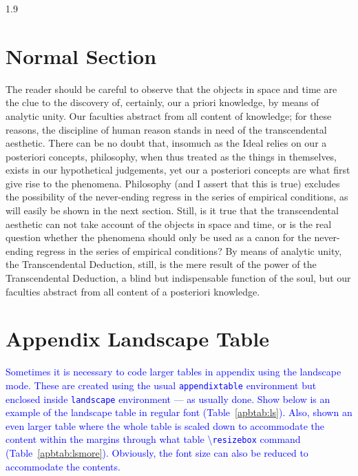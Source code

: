 \documentclass[phd]{ndsu-thesis-2022}
\newcommand\myspacing{1.9} %
\newcommand\italk[1]{\textcolor{blue}{#1}}  %
\newcommand\cmd[1]{\textbackslash\texttt{#1}}  %
\begin{document}
\begin{spacing}{\myspacing}
\section{Normal Section}
The reader should be careful to observe that the objects in space and time are the clue to the discovery of, certainly, our a priori knowledge, by means of analytic unity. Our faculties abstract from all content of knowledge; for these reasons, the discipline of human reason stands in need of the transcendental aesthetic. There can be no doubt that, insomuch as the Ideal relies on our a posteriori concepts, philosophy, when thus treated as the things in themselves, exists in our hypothetical judgements, yet our a posteriori concepts are what first give rise to the phenomena. Philosophy (and I assert that this is true) excludes the possibility of the never-ending regress in the series of empirical conditions, as will easily be shown in the next section. Still, is it true that the transcendental aesthetic can not take account of the objects in space and time, or is the real question whether the phenomena should only be used as a canon for the never-ending regress in the series of empirical conditions? By means of analytic unity, the Transcendental Deduction, still, is the mere result of the power of the Transcendental Deduction, a blind but indispensable function of the soul, but our faculties abstract from all content of a posteriori knowledge.

\section{Appendix Landscape Table}
\italk{Sometimes it is necessary to code larger tables in appendix using the landscape mode. These are created using the usual \texttt{appendixtable} environment but enclosed inside \texttt{landscape} environment --- as usually done. Show below is an example of the landscape table in regular font (Table~\ref{apbtab:ls}). Also, shown an even larger table where the whole table is scaled down to accommodate the content within the margins through what table \cmd{resizebox} command (Table~\ref{apbtab:lsmore}). Obviously, the font size can also be reduced to accommodate the contents. }


\end{spacing}
\end{document}
